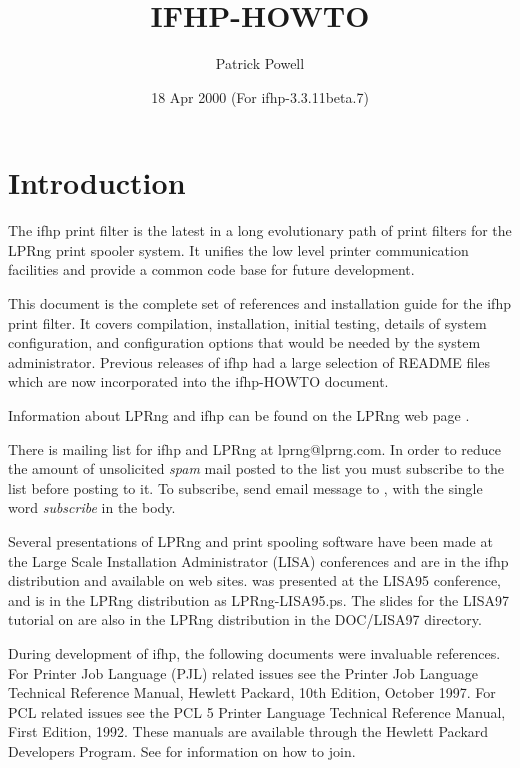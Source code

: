 \documentclass[a4paper]{article}
\title{ IFHP-HOWTO}
\author{Patrick Powell
{\ttfamily \onlynameurl{papowell@astart.com}}}
\date{ 18 Apr 2000 (For ifhp-3.3.11beta.7)}
\begin{document}
\maketitle
\tableofcontents

\section{Introduction}

The {\ttfamily ifhp} print filter is the latest in a long evolutionary path
of print filters for the {\ttfamily LPRng} print spooler system.
It unifies the low level printer communication facilities
and provide a common code base for future development.

This document is the complete set of references and
installation guide for the {\ttfamily ifhp} print filter.
It covers compilation, installation,
initial testing,
details of system configuration,
and configuration options that would be needed by the
system administrator.
Previous releases of {\ttfamily ifhp} had a large selection of
{\ttfamily README}
files
which are now incorporated into the {\ttfamily ifhp}-HOWTO document.

\label{website} 
Information
about LPRng and {\ttfamily ifhp} can be found on the LPRng web page
.

\label{maillist} 
There is mailing list for {\ttfamily ifhp} and {\ttfamily LPRng} at {\ttfamily lprng@lprng.com}.
In order to reduce the amount of unsolicited {\itshape spam\/} mail posted to the list
you must subscribe to the list before posting to it.
To subscribe,
send email message to
{\ttfamily {}},
with the single word {\itshape subscribe\/} in the body.

Several presentations of LPRng and print spooling software have been made
at the Large Scale Installation Administrator (LISA) conferences and
are in the {\ttfamily ifhp} distribution and available on web sites.
was presented at the LISA95 conference,
and is in the LPRng distribution as LPRng-LISA95.ps.
The slides for the LISA97 tutorial on
are also in the LPRng distribution in the DOC/LISA97 directory.

During development of {\ttfamily ifhp}, the following documents were invaluable
references.
For Printer Job Language (PJL) related issues
see the Printer Job Language Technical Reference Manual,
Hewlett Packard, 10th Edition, October 1997.
For PCL related issues see
the PCL 5 Printer Language Technical Reference Manual,
First Edition, 1992.
These manuals are available through the Hewlett Packard Developers Program.
See
for information on how to join.
\end{document}
